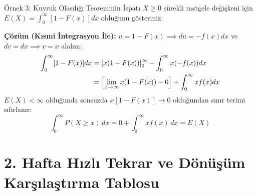 \documentclass[12pt,a4paper]{article}
\begin{document}
\begin{ornek}{Örnek 3: Kuyruk Olasılığı Teoreminin İspatı}
$X \ge 0$ sürekli rastgele değişkeni için $E(X) = \int_{0}^{\infty} [1 - F(x)] dx$ olduğunu gösteriniz.

\bigskip
\textbf{Çözüm (Kısmi İntegrasyon İle):}
$u = 1 - F(x) \implies du = -f(x)dx$ ve $dv = dx \implies v = x$ alalım:
\begin{align}
    \int_{0}^{\infty} [1 - F(x)] dx &= \left[ x(1 - F(x)) \right]_{0}^{\infty} - \int_{0}^{\infty} x (-f(x)) dx \notag \\
    &= \left[ \lim_{x \to \infty} x(1 - F(x)) - 0 \right] + \int_{0}^{\infty} x f(x) dx
\end{align}
$E(X) < \infty$ olduğunda sonsuzda $x[1-F(x)] \to 0$ olduğundan sınır terimi sıfırlanır:
\begin{equation}
    \int_{0}^{\infty} P(X \ge x) \, dx = 0 + \int_{0}^{\infty} x f(x) \, dx = \boxed{E(X)}
\end{equation}
\end{ornek}

\begin{center}
\end{center}

\vspace{0.5em}
\section{2. Hafta Hızlı Tekrar ve Dönüşüm Karşılaştırma Tablosu}
\end{document}
